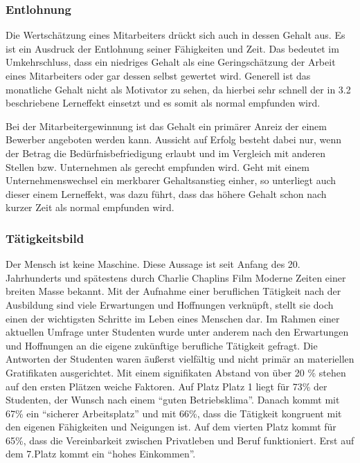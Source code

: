 \subsubsection{Entlohnung}
Die Wertschätzung eines Mitarbeiters drückt sich auch in dessen Gehalt aus. Es ist ein Ausdruck der Entlohnung seiner Fähigkeiten und Zeit. Das bedeutet im Umkehrschluss, dass ein niedriges Gehalt als eine Geringschätzung der Arbeit eines Mitarbeiters oder gar dessen selbst gewertet wird. Generell ist das monatliche Gehalt nicht als Motivator zu sehen, da hierbei sehr schnell der in 3.2 beschriebene Lerneffekt einsetzt und es somit als normal empfunden wird.

Bei der Mitarbeitergewinnung ist das Gehalt ein primärer Anreiz der einem Bewerber angeboten werden kann. Aussicht auf Erfolg besteht dabei nur, wenn der Betrag die Bedürfnisbefriedigung erlaubt und im Vergleich mit anderen Stellen bzw. Unternehmen als gerecht empfunden wird. Geht mit einem Unternehmenswechsel ein merkbarer Gehaltsanstieg einher, so unterliegt auch dieser einem Lerneffekt, was dazu führt, dass das höhere Gehalt schon nach kurzer Zeit als normal empfunden wird.

\subsubsection{Tätigkeitsbild}
Der Mensch ist keine Maschine. Diese Aussage ist seit Anfang des 20. Jahrhunderts und spätestens durch Charlie Chaplins Film \glqq Moderne Zeiten\grqq \cite{Chaplin.1936} einer breiten Masse bekannt. 
Mit der Aufnahme einer beruflichen Tätigkeit nach der Ausbildung sind viele Erwartungen und Hoffnungen verknüpft, stellt sie doch einen der wichtigsten Schritte im Leben eines Menschen dar.  
Im Rahmen einer aktuellen Umfrage \citep{Allensbach.2014} unter Studenten wurde unter anderem nach den Erwartungen und Hoffnungen an die eigene zukünftige berufliche Tätigkeit gefragt. Die Antworten der Studenten waren äußerst vielfältig und nicht \glqq primär an materiellen Gratifikaten ausgerichtet\grqq. Mit einem signifikaten Abstand von über 20 \% stehen auf den ersten Plätzen weiche Faktoren. Auf Platz Platz 1 liegt für 73\% der Studenten, der Wunsch nach einem “guten Betriebsklima”. Danach kommt mit 67\% ein “sicherer Arbeitsplatz” und mit 66\%, dass die Tätigkeit kongruent mit den eigenen Fähigkeiten und Neigungen ist. Auf dem vierten Platz kommt für 65\%, dass die Vereinbarkeit zwischen Privatleben und Beruf funktioniert. Erst auf dem 7.Platz kommt ein “hohes Einkommen”.

